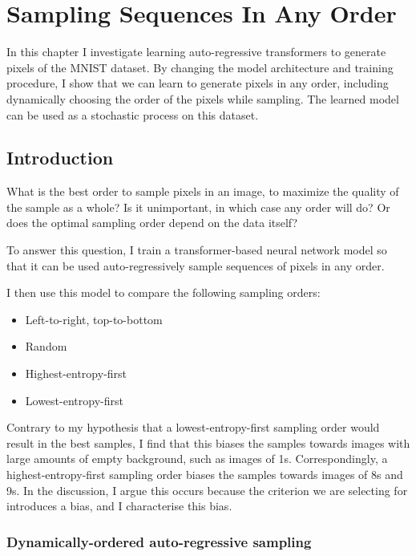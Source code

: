 \chapter{Sampling Sequences In Any Order}
\label{C:a-o-sampling}

In this chapter I investigate learning auto-regressive transformers to generate pixels of the MNIST dataset. By changing the model architecture and training procedure, I show that we can learn to generate pixels in any order, including dynamically choosing the order of the pixels while sampling. The learned model can be used as a stochastic process on this dataset.

\section{Introduction}

What is the best order to sample pixels in an image, to maximize the quality of the sample as a whole? Is it unimportant, in which case any order will do? Or does the optimal sampling order depend on the data itself?

To answer this question, I train a transformer-based neural network model so that it can be used auto-regressively sample sequences of pixels in any order.

I then use this model to compare the following sampling orders:
\begin{itemize}
    \item Left-to-right, top-to-bottom
    \item Random
    \item Highest-entropy-first
    \item Lowest-entropy-first
\end{itemize}

Contrary to my hypothesis that a lowest-entropy-first sampling order would result in the best samples, I find that this biases the samples towards images with large amounts of empty background, such as images of 1s. Correspondingly, a highest-entropy-first sampling order biases the samples towards images of 8s and 9s. In the discussion, I argue this occurs because the criterion we are selecting for introduces a bias, and I characterise this bias.



\subsection{Dynamically-ordered auto-regressive sampling}

